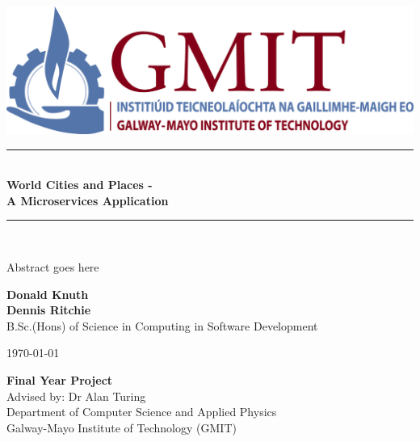 \documentclass[11pt,a4paper,oneside,openany]{book}
\newcommand{\projecttitle}{ World Cities and Places - \\ A Microservices Application}
\newcommand{\projectauthor}{Donald Knuth \\[0.2cm] Dennis Ritchie}
\newcommand{\projectadvisor}{Dr Alan Turing}
\newcommand{\projectprogramme}{B.Sc.(Hons) of Science in Computing in Software Development}
\newcommand{\projectabstract}{Abstract goes here}
\newcommand{\projectdate}{\today}
\begin{document}
  \begin{titlepage}
  	 \begin{center}    
  		\includegraphics{img/gmit-logo.jpg}
  	\end{center}
    \begin{minipage}[t][4cm]{\textwidth}
      \centering
      \rule{\linewidth}{0.5mm} \\[0.4cm]
      { \LARGE \bfseries \projecttitle \\[0.4cm] }
      \rule{\linewidth}{0.5mm} \\[0.8cm]
    \end{minipage}
    
      \begin{minipage}[t][5.5cm]{\textwidth}
    	\centering
    	
    	\projectabstract
    \end{minipage}
    
    \begin{minipage}[t][3.5cm]{\textwidth}
      \centering
      \textbf{\projectauthor}\\[0.5cm]
      \projectprogramme
    \end{minipage}
   

  
    \begin{minipage}[t][1cm]{\textwidth}
      \centering
      \textsc{\projectdate}
    \end{minipage}
      
    \begin{minipage}[t][3cm]{\textwidth}
      \centering
      \textbf{Final Year Project}\\[0.3cm]
      Advised by: \projectadvisor \\[0.1cm]
      Department of Computer Science and Applied Physics\\
      Galway-Mayo Institute of Technology (GMIT)
    \end{minipage}
  
   
  \end{titlepage}
   
  \setcounter{page}{2}
  \tableofcontents
  \listoffigures
  
    
 
  
  
  
  
  
  
  
  
\end{document}
